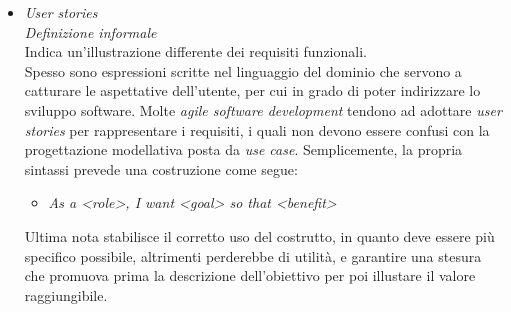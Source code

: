 \documentclass{article}
\begin{document}
\begin{itemize}[label={-}]
    \item \textit{User stories}\vspace*{7pt}\\\textit{Definizione informale}\\Indica un'illustrazione differente dei requisiti funzionali.\vspace*{14pt}\\Spesso sono espressioni scritte nel linguaggio del dominio che servono a catturare le aspettative dell'utente, per cui in grado di poter indirizzare lo sviluppo software. Molte \textit{agile software development} tendono ad adottare \textit{user stories} per rappresentare i requisiti, i quali non devono essere confusi con la progettazione modellativa posta da \textit{use case}. Semplicemente, la propria sintassi prevede una costruzione come segue: \begin{itemize}[label={ }, leftmargin=1cm] \item \textit{As a <role>, I want <goal> so that <benefit>}\end{itemize} Ultima nota stabilisce il corretto uso del costrutto, in quanto deve essere più specifico possibile, altrimenti perderebbe di utilità, e garantire una stesura che promuova prima la descrizione dell'obiettivo per poi illustare il valore raggiungibile.
\end{itemize}
\end{document}
